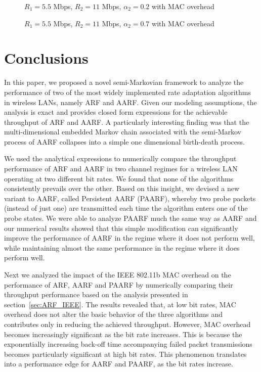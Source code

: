 \documentclass[11pt, journal, letterpaper, oneside, onecolumn]{IEEEtran}
\newcommand{\linegap}{1}
\begin{document}
\begin{figure}[t]
\centering
{}
\caption{$R_{1}=5.5$ Mbps, $R_{2}=11$ Mbps, $\alpha_{2}=0.2$ with
MAC overhead} \label{fig:ARFAARFPAARF2511}
\end{figure}
\renewcommand{\baselinestretch}{\linegap}


\begin{figure}[t]
\centering
{}
\caption{$R_{1}=5.5$ Mbps, $R_{2}=11$ Mbps, $\alpha_{2}=0.7$ with
MAC overhead} \label{fig:ARFAARFPAARF7511}
\end{figure}
\renewcommand{\baselinestretch}{\linegap}

\section {Conclusions}
\label{sec:Conclusions}


In this paper, we proposed a novel semi-Markovian framework
to analyze the performance of two of the most widely implemented
rate adaptation algorithms in wireless LANs, namely ARF and AARF.
Given our modeling assumptions, the analysis is exact and provides
closed form expressions for the achievable throughput of ARF and
AARF.
A particularly interesting finding was that
the multi-dimensional embedded Markov chain associated with the
semi-Markov process of AARF collapses into a simple one
dimensional birth-death process.


We used the analytical expressions to numerically compare the throughput
performance of ARF and AARF in two channel regimes for a wireless
LAN operating at two different bit rates. We found that none of the algorithms consistently prevails over the other.
Based on this insight, we devised a new variant to AARF, called
Persistent AARF (PAARF), whereby two probe packets (instead of
just one) are transmitted each time the algorithm enters one of
the probe states. We were able to analyze PAARF much the same way
as AARF and our numerical results showed that this simple
modification can significantly improve the performance of AARF in
the regime where it does not perform well, while maintaining
almost the same performance in the regime where it does perform
well.


Next we analyzed the impact of the IEEE 802.11b MAC overhead on the
performance of ARF, AARF and PAARF by numerically comparing their
throughput performance based on the analysis presented in
section~\ref{sec:ARF_IEEE}. The results revealed that, at low bit rates,
MAC overhead does not alter the basic behavior of the three
algorithms and contributes only in reducing the achieved throughput.
However, MAC overhead becomes increasingly significant as the
bit rate increases. This is because the exponentially
increasing back-off time accompanying failed packet transmissions
becomes particularly significant at high bit rates. This
phenomenon translates into a performance edge for AARF and PAARF, as
the bit rates increase.
\end{document}
